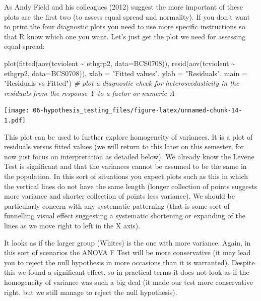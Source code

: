 \documentclass[
]{book}
\newenvironment{Shaded}{\begin{snugshade}}{\end{snugshade}}
\newcommand{\AttributeTok}[1]{\textcolor[rgb]{0.77,0.63,0.00}{#1}}
\newcommand{\CommentTok}[1]{\textcolor[rgb]{0.56,0.35,0.01}{\textit{#1}}}
\newcommand{\FunctionTok}[1]{\textcolor[rgb]{0.00,0.00,0.00}{#1}}
\newcommand{\NormalTok}[1]{#1}
\newcommand{\SpecialCharTok}[1]{\textcolor[rgb]{0.00,0.00,0.00}{#1}}
\newcommand{\StringTok}[1]{\textcolor[rgb]{0.31,0.60,0.02}{#1}}
\begin{document}
As Andy Field and his colleagues (2012) suggest the more important of these plots are the first two (to assess equal spread and normality). If you don't want to print the four diagnostic plots you need to use more specific instructions so that R know which one you want. Let's just get the plot we need for assessing equal spread:

\begin{Shaded}
\begin{Highlighting}[]
\FunctionTok{plot}\NormalTok{(}\FunctionTok{fitted}\NormalTok{(}\FunctionTok{aov}\NormalTok{(tcviolent }\SpecialCharTok{\textasciitilde{}}\NormalTok{ ethgrp2, }\AttributeTok{data=}\NormalTok{BCS0708)), }\FunctionTok{resid}\NormalTok{(}\FunctionTok{aov}\NormalTok{(tcviolent }\SpecialCharTok{\textasciitilde{}}\NormalTok{ ethgrp2, }\AttributeTok{data=}\NormalTok{BCS0708)), }\AttributeTok{xlab =} \StringTok{"Fitted values"}\NormalTok{, }\AttributeTok{ylab =} \StringTok{"Residuals"}\NormalTok{, }\AttributeTok{main =} \StringTok{"Residuals vs Fitted"}\NormalTok{)     }\CommentTok{\# plot a diagnostic check for heteroscedasticity in the residuals from the response Y to a factor or numeric A}
\end{Highlighting}
\end{Shaded}

\texttt{[image: 06-hypothesis\_testing\_files/figure-latex/unnamed-chunk-14-1.pdf]}

This plot can be used to further explore homogeneity of variances. It is a plot of residuals versus fitted values (we will return to this later on this semester, for now just focus on interpretation as detailed below). We already know the Levene Test is significant and that the variances cannot be assumed to be the same in the population. In this sort of situations you expect plots such as this in which the vertical lines do not have the same length (longer collection of points suggests more variance and shorter collection of points less variance). We should be particularly concern with any systematic patterning (that is some sort of funnelling visual effect suggesting a systematic shortening or expanding of the lines as we move right to left in the X axis).

It looks as if the larger group (Whites) is the one with more variance. Again, in this sort of scenarios the ANOVA F Test will be more conservative (it may lead you to reject the null hypothesis in more occasions than it is warranted). Despite this we found a significant effect, so in practical terms it does not look as if the homogeneity of variance was such a big deal (it made our test more conservative right, but we still manage to reject the null hypothesis).
\end{document}

